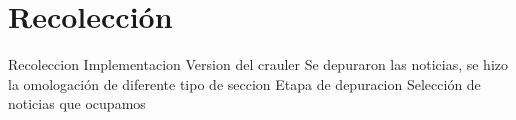 \section{Recolección}

	Recoleccion
		Implementacion
		Version del crauler 
		Se depuraron las noticias, se hizo la omologación de diferente tipo de seccion
		Etapa de depuracion
		Selección de noticias que ocupamos